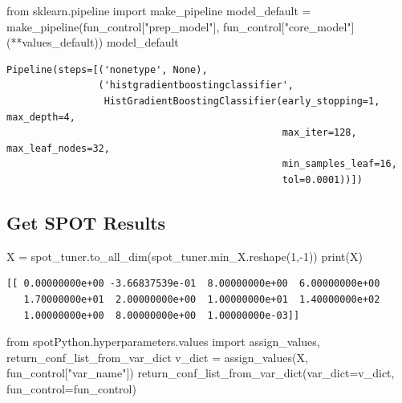 \documentclass[
  letterpaper,
  DIV=11,
  numbers=noendperiod]{scrreprt}
\newenvironment{Shaded}{\begin{snugshade}}{\end{snugshade}}
\newcommand{\BuiltInTok}[1]{\textcolor[rgb]{0.00,0.23,0.31}{#1}}
\newcommand{\DecValTok}[1]{\textcolor[rgb]{0.68,0.00,0.00}{#1}}
\newcommand{\ImportTok}[1]{\textcolor[rgb]{0.00,0.46,0.62}{#1}}
\newcommand{\NormalTok}[1]{\textcolor[rgb]{0.00,0.23,0.31}{#1}}
\newcommand{\OperatorTok}[1]{\textcolor[rgb]{0.37,0.37,0.37}{#1}}
\newcommand{\StringTok}[1]{\textcolor[rgb]{0.13,0.47,0.30}{#1}}
\begin{document}
\begin{Shaded}
\begin{Highlighting}[]
\ImportTok{from}\NormalTok{ sklearn.pipeline }\ImportTok{import}\NormalTok{ make\_pipeline}
\NormalTok{model\_default }\OperatorTok{=}\NormalTok{ make\_pipeline(fun\_control[}\StringTok{"prep\_model"}\NormalTok{], fun\_control[}\StringTok{"core\_model"}\NormalTok{](}\OperatorTok{**}\NormalTok{values\_default))}
\NormalTok{model\_default}
\end{Highlighting}
\end{Shaded}

\begin{verbatim}
Pipeline(steps=[('nonetype', None),
                ('histgradientboostingclassifier',
                 HistGradientBoostingClassifier(early_stopping=1, max_depth=4,
                                                max_iter=128, max_leaf_nodes=32,
                                                min_samples_leaf=16,
                                                tol=0.0001))])
\end{verbatim}

\hypertarget{get-spot-results-3}{%
\subsection{Get SPOT Results}\label{get-spot-results-3}}

\begin{Shaded}
\begin{Highlighting}[]
\NormalTok{X }\OperatorTok{=}\NormalTok{ spot\_tuner.to\_all\_dim(spot\_tuner.min\_X.reshape(}\DecValTok{1}\NormalTok{,}\OperatorTok{{-}}\DecValTok{1}\NormalTok{))}
\BuiltInTok{print}\NormalTok{(X)}
\end{Highlighting}
\end{Shaded}

\begin{verbatim}
[[ 0.00000000e+00 -3.66837539e-01  8.00000000e+00  6.00000000e+00
   1.70000000e+01  2.00000000e+00  1.00000000e+01  1.40000000e+02
   1.00000000e+00  8.00000000e+00  1.00000000e-03]]
\end{verbatim}

\begin{Shaded}
\begin{Highlighting}[]
\ImportTok{from}\NormalTok{ spotPython.hyperparameters.values }\ImportTok{import}\NormalTok{ assign\_values, return\_conf\_list\_from\_var\_dict}
\NormalTok{v\_dict }\OperatorTok{=}\NormalTok{ assign\_values(X, fun\_control[}\StringTok{"var\_name"}\NormalTok{])}
\NormalTok{return\_conf\_list\_from\_var\_dict(var\_dict}\OperatorTok{=}\NormalTok{v\_dict, fun\_control}\OperatorTok{=}\NormalTok{fun\_control)}
\end{Highlighting}
\end{Shaded}
\end{document}
